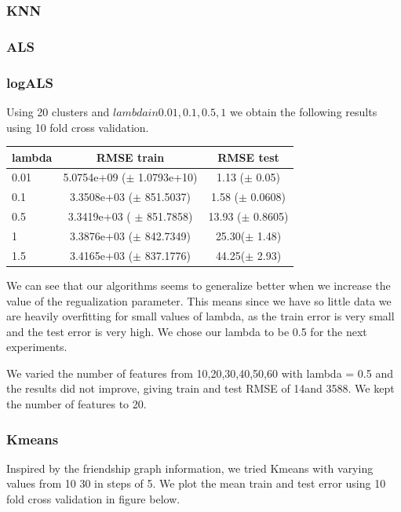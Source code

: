 \subsubsection{KNN}
\subsubsection{ALS}

\subsubsection{logALS}
Using 20 clusters and $lambda in 0.01,0.1,0.5,1$ we obtain the following results using 10 fold cross validation.
\begin{center}
  \begin{tabular}{ |l | c | c| }
    \hline
     lambda & RMSE train & RMSE test \\ \hline
     0.01   & 5.0754e+09 ($\pm$  1.0793e+10) & 1.13 ($\pm$ 0.05) \\ \hline
     0.1     &  3.3508e+03 ($\pm$ 851.5037)  & 1.58 ($\pm$ 0.0608) \\ \hline
     0.5    & 3.3419e+03  ( $\pm$ 851.7858)   &13.93 ($\pm$ 0.8605)\\ \hline
     1       & 3.3876e+03 ($\pm$ 842.7349)   &25.30($\pm$ 1.48)\\ \hline
     1.5    & 3.4165e+03 ($\pm$ 837.1776) & 44.25($\pm$ 2.93) \\
    \hline
  \end{tabular}
  	\label{table:feat_transform}
\end{center}
We can see that our algorithms seems to generalize better when we increase the value of
the regualization parameter. This means since we have so little data we are heavily overfitting for small values of lambda, as the train error is very small and the test error is very high. We chose our lambda to be 0.5 for the next experiments.

We varied the number of features from 10,20,30,40,50,60 with lambda = 0.5 and the results
did not improve, giving train and test RMSE of 14and 3588.
We kept the number of features to 20.

\subsubsection{Kmeans}
Inspired by the friendship graph information, we tried Kmeans with
varying values from 10 30 in steps of 5. We plot the mean train and test error using 10 fold cross validation in figure below.

